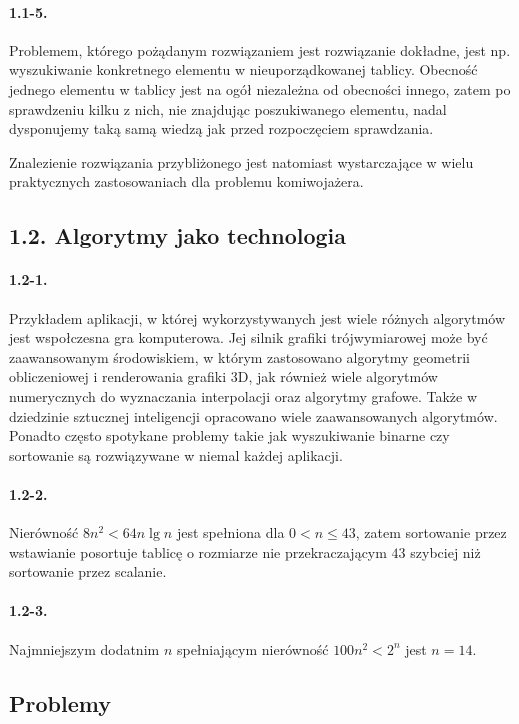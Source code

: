 \paragraph{1.1-5.}
Problemem, którego pożądanym rozwiązaniem jest rozwiązanie dokładne, jest np. wyszukiwanie konkretnego elementu w nieuporządkowanej tablicy. Obecność jednego elementu w tablicy jest na ogół niezależna od obecności innego, zatem po sprawdzeniu kilku z nich, nie znajdując poszukiwanego elementu, nadal dysponujemy taką samą wiedzą jak przed rozpoczęciem sprawdzania.

Znalezienie rozwiązania przybliżonego jest natomiast wystarczające w wielu praktycznych zastosowaniach dla problemu komiwojażera.

\subsection*{1.2. Algorytmy jako technologia}

\paragraph{1.2-1.}
Przykładem aplikacji, w której wykorzystywanych jest wiele różnych algorytmów jest wspołczesna gra komputerowa. Jej silnik grafiki trójwymiarowej może być zaawansowanym środowiskiem, w którym zastosowano algorytmy geometrii obliczeniowej i renderowania grafiki 3D, jak również wiele algorytmów numerycznych do wyznaczania interpolacji oraz algorytmy grafowe. Także w dziedzinie sztucznej inteligencji opracowano wiele zaawansowanych algorytmów. Ponadto często spotykane problemy takie jak wyszukiwanie binarne czy sortowanie są rozwiązywane w niemal każdej aplikacji.

\paragraph{1.2-2.}
Nierówność $8n^2 < 64n\lg n$ jest spełniona dla $0<n\le 43$, zatem sortowanie przez wstawianie posortuje tablicę o rozmiarze nie przekraczającym $43$ szybciej niż sortowanie przez scalanie.

\paragraph{1.2-3.}
Najmniejszym dodatnim $n$ spełniającym nierówność $100n^2 < 2^n$ jest $n=14$.

\subsection*{Problemy}
